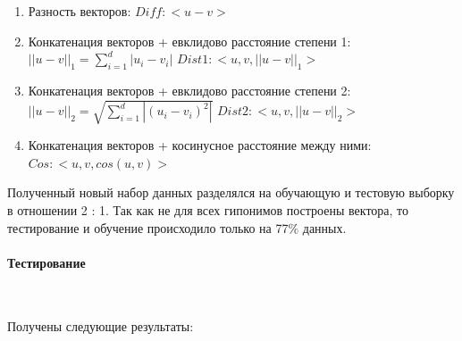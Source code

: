 \begin{enumerate}
\item Разность векторов: \newline
$Diff: <u - v>$

\item Конкатенация векторов + евклидово расстояние степени 1: \newline
$||u - v||_1 = \sum_{i=1}^{d}|u_i - v_i|$ \newline
$Dist1: <u, v, ||u - v||_1>$

\item Конкатенация векторов + евклидово расстояние степени 2: \newline
$||u - v||_2 = \sqrt{\sum_{i=1}^{d}|(u_i - v_i)^2|}$ \newline
$Dist2: <u, v, || u - v ||_2>$

\item Конкатенация векторов + косинусное расстояние между ними: \newline
$Cos: <u, v, cos(u, v)>$
\end{enumerate}

Полученный новый набор данных разделялся на обучающую и тестовую выборку в
отношении 2 : 1. Так как не для всех гипонимов построены вектора, то тестирование и
обучение происходило только на 77\% данных.

\paragraph{Тестирование}
~\
~\

Получены следующие результаты:


